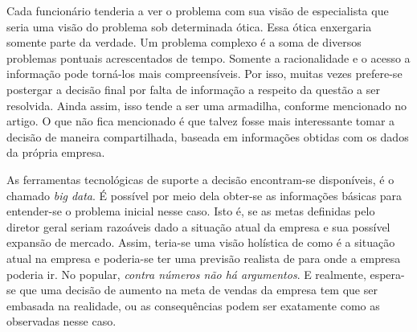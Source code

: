Cada funcionário tenderia a ver o problema com sua visão de especialista
que seria uma visão do problema sob determinada ótica. Essa ótica
enxergaria somente parte da verdade. Um problema complexo é a soma
de diversos problemas pontuais acrescentados de tempo. Somente a racionalidade
e o acesso a informação pode torná-los mais compreensíveis. Por isso,
muitas vezes prefere-se postergar a decisão final por falta de informação
a respeito da questão a ser resolvida. Ainda assim, isso tende a ser
uma armadilha, conforme mencionado no artigo. O que não fica mencionado
é que talvez fosse mais interessante tomar a decisão de maneira compartilhada,
baseada em informações obtidas com os dados da própria empresa.

As ferramentas tecnológicas de suporte a decisão encontram-se disponíveis,
é o chamado \emph{big data}. É possível por meio dela obter-se as
informações básicas para entender-se o problema inicial nesse caso.
Isto é, se as metas definidas pelo diretor geral seriam razoáveis
dado a situação atual da empresa e sua possível expansão de mercado.
Assim, teria-se uma visão holística de como é a situação atual na
empresa e poderia-se ter uma previsão realista de para onde a empresa
poderia ir. No popular, \emph{contra números não há argumentos}. E
realmente, espera-se que uma decisão de aumento na meta de vendas
da empresa tem que ser embasada na realidade, ou as consequências
podem ser exatamente como as observadas nesse caso.

